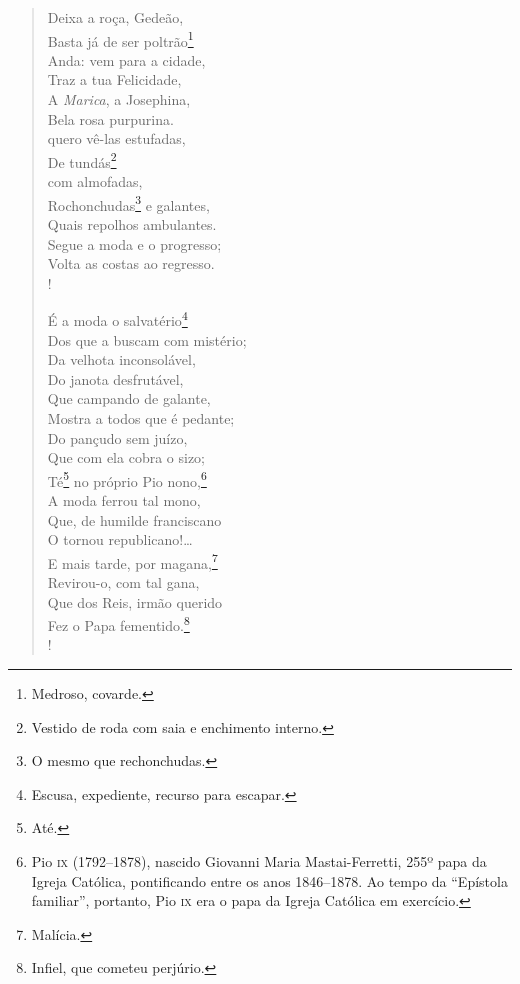 \begin{verse}
Deixa a roça, Gedeão,\\
Basta já de ser poltrão\footnote{ Medroso, covarde.}\\
Anda: vem para a cidade,\\
Traz a tua Felicidade,\\
A \emph{Marica}, a Josephina,\\
Bela rosa purpurina.\\
quero vê-las estufadas,\\
De tundás\footnote{ Vestido de roda com saia e enchimento interno.}\\
com almofadas,\\
Rochonchudas\footnote{ O mesmo que rechonchudas.} e galantes,\\
Quais repolhos ambulantes.\\
Segue a moda e o progresso;\\
Volta as costas ao regresso.\\!

É a moda o salvatério\footnote{ Escusa, expediente, recurso para escapar.}\\
Dos que a buscam com mistério;\\
Da velhota inconsolável,\\
Do janota desfrutável,\\
Que campando de galante,\\
Mostra a todos que é pedante;\\
Do pançudo sem juízo,\\
Que com ela cobra o sizo;\\
Té\footnote{ Até.} no próprio Pio nono,\footnote{ Pio \textsc{ix} (1792--1878), 
                      nascido Giovanni Maria Mastai-Ferretti, 255º papa da
                      Igreja Católica, pontificando entre os anos 1846--1878. Ao tempo da
                      ``Epístola familiar'', portanto, Pio \textsc{ix} era o papa da Igreja
                      Católica em exercício.}\\
A moda ferrou tal mono,\\
Que, de humilde franciscano\\
O tornou republicano!\ldots{}\\
E mais tarde, por magana,\footnote{ Malícia.}\\
Revirou-o, com tal gana,\\
Que dos Reis, irmão querido\\
Fez o Papa fementido.\footnote{ Infiel, que cometeu perjúrio.}\\!


\end{verse}
